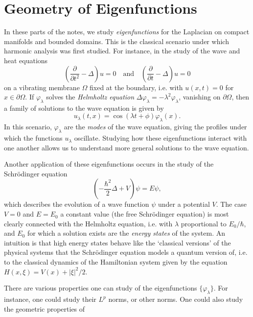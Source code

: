 
\part{Geometry of Eigenfunctions}



In these parts of the notes, we study \emph{eigenfunctions} for the Laplacian on compact manifolds and bounded domains. This is the classical scenario under which harmonic analysis was first studied. For instance, in the study of the wave and heat equations
%
\[ \left( \frac{\partial}{\partial t^2} - \Delta \right) u = 0 \quad\text{and}\quad \left( \frac{\partial}{\partial t} - \Delta \right) u = 0 \]
%
on a vibrating membrane $\Omega$ fixed at the boundary, i.e. with $u(x,t) = 0$ for $x \in \partial \Omega$. If $\varphi_\lambda$ solves the \emph{Helmholtz equation} $\Delta \varphi_\lambda = - \lambda^2 \varphi_\lambda$, vanishing on $\partial \Omega$, then a family of solutions to the wave equation is given by
%
\[ u_\lambda(t,x) = \cos(\lambda t + \phi) \varphi_\lambda(x). \]
%
In this scenario, $\varphi_\lambda$ are the \emph{modes} of the wave equation, giving the profiles under which the functions $u_\lambda$ oscillate. Studying how these eigenfunctions interact with one another allows us to understand more general solutions to the wave equation.

Another application of these eigenfunctions occurs in the study of the Schr\"{o}dinger equation
%
\[ \left( - \frac{\hbar^2}{2} \Delta + V \right) \psi = E \psi, \]
%
which describes the evolution of a wave function $\psi$ under a potential $V$. The case $V = 0$ and $E = E_0$ a constant value (the free Schr\"{o}dinger equation) is most clearly connected with the Helmholtz equation, i.e. with $\lambda$ proportional to $E_0 / \hbar$, and $E_0$ for which a solution exists are the \emph{energy states} of the system. An intuition is that high energy states behave like the `classical versions' of the physical systems that the Schr\"{o}dinger equation models a quantum version of, i.e. to the classical dynamics of the Hamiltonian system given by the equation $H(x,\xi) = V(x) + |\xi|^2 / 2$.

There are various properties one can study of the eigenfunctions $\{ \varphi_\lambda \}$. For instance, one could study their $L^p$ norms, or other norms. One could also study the geometric properties of 

